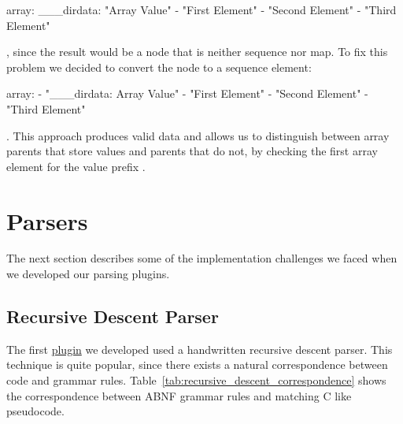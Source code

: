 \begin{yamlcode}
  array:
    ___dirdata: "Array Value"
    - "First Element"
    - "Second Element"
    - "Third Element"
\end{yamlcode}

, since the result would be a  node that is neither sequence nor map. To fix this problem we decided to convert the  node to a sequence element:

\begin{yamlcode}
  array:
    - "___dirdata: Array Value"
    - "First Element"
    - "Second Element"
    - "Third Element"
\end{yamlcode}

. This approach produces valid  data and allows us to distinguish between array parents that store values and parents that do not, by checking the first array element for the value prefix .

\section{Parsers}

The next section describes some of the implementation challenges we faced when we developed our parsing plugins.

\subsection{Recursive Descent Parser}

The first \href{https://github.com/ElektraInitiative/libelektra/commit/3d2d4644cb08e83f0b3305b8aeae546ada52dfe7}{ plugin} we developed used a handwritten recursive descent parser. This technique is quite popular, since there exists a natural correspondence between code and grammar rules. Table~\ref{tab:recursive_descent_correspondence} shows the correspondence between \gls{ABNF} grammar rules and matching C like pseudocode.

